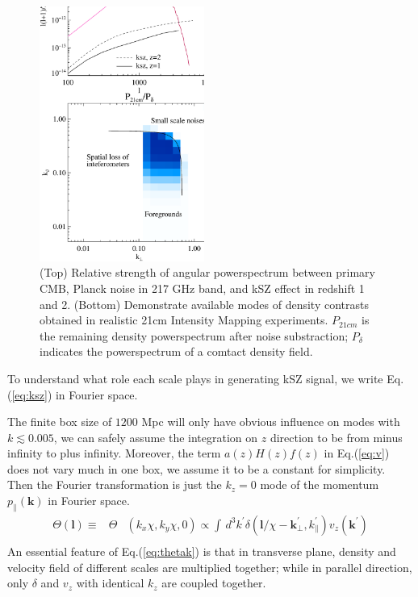 \begin{figure}[tbp]
\begin{center}
\includegraphics[width=0.48\textwidth]{figure/cmb_21cm.eps}
\end{center}
\vspace{-0.7cm}
\caption{
    (Top) Relative strength of angular powerspectrum between primary CMB, Planck noise in 217 GHz band, and kSZ effect in redshift 1 and 2.
    (Bottom) Demonstrate available modes of density contrasts obtained 
    in realistic 21cm Intensity Mapping experiments. 
    $P_{21cm}$ is the remaining density powerspectrum after noise substraction; 
    $P_\delta$ indicates the powerspectrum of a comtact density field.
}
\label{fig:cmb_21cm}
\end{figure}

To understand what role each scale plays in generating kSZ signal, we write Eq.(\ref{eq:ksz}) in Fourier space. 

The finite box size of $1200$ Mpc will only have obvious influence on modes with $k\lesssim0.005$, 
we can safely assume the integration on $z$ direction to be from minus infinity to plus infinity. 
Moreover, the term $a(z)H(z)f(z)$ in Eq.(\ref{eq:v}) does not vary much in one box, we assume it to be a constant for simplicity. 
Then the Fourier transformation is just the $k_z=0$ mode of the momentum 
$p_\parallel(\bm{k})$ in Fourier space. 
\begin{eqnarray}
    \label{eq:thetak}
    \Theta(\bm{l})\equiv&\Theta&({k}_x\chi,{k}_y\chi,0)\propto\int\, 
    d^3k^\prime\delta(\bm{l}/\chi-\bm{k}_\perp^\prime,k_\parallel^\prime) v_z(\bm{k^\prime})\nonumber\\
    \end{eqnarray}
An essential feature of Eq.(\ref{eq:thetak}) is that
in transverse plane, density and velocity field of different scales are multiplied together;
 while in parallel direction, only $\delta$ and $v_z$ with identical $k_z$ are coupled together.  

